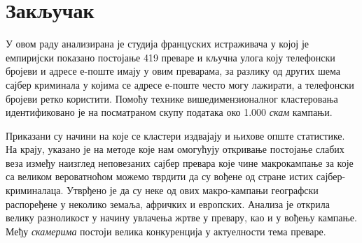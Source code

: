 \documentclass[a4paper]{article}
\begin{document}
\section{Закључак}

У овом раду анализирана је студија француских истраживача у којој је емпиријски показано постојање 419 преваре и кључна улога коју телефонски бројеви и адресе е-поште имају у овим преварама, за разлику од других шема сајбер криминала у којима се адресе е-поште често могу лажирати, а телефонски бројеви ретко користити. Помоћу технике вишедимензионалног кластеровања идентификовано је на посматраном скупу података око 1.000 \emph{скам} кампањи.

Приказани су начини на које се кластери издвајају и њихове опште статистике. На крају, указано је на методе које нам омогућују откривање постојање слабих веза између наизглед неповезаних сајбер превара које чине макрокампање за које са великом вероватноћом можемо тврдити да су вођене од стране истих сајбер-криминалаца. Утврђено је да су неке од ових макро-кампањи географски распоређене у неколико земаља, афричких и европских. Анализа је открила велику разноликост у начину увлачења жртве у превару, као и у вођењу кампање. Међу \emph{скамерима} постоји велика конкуренција у актуелности тема преваре.





 

\appendix

\end{document}
